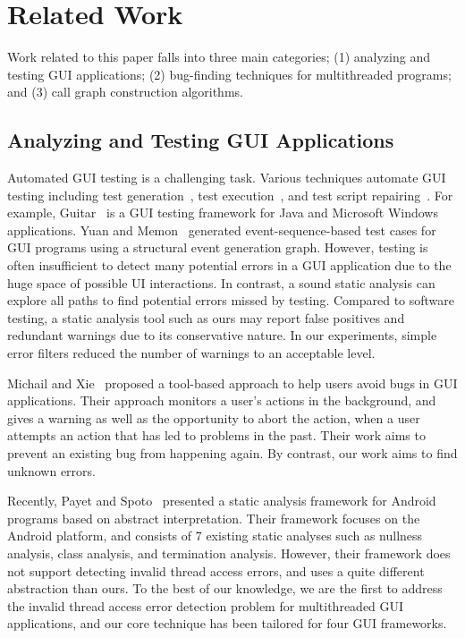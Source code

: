 
\tinystep
\section{Related Work}

Work related to this paper falls into three main categories; (1)
analyzing and testing GUI applications; (2)
bug-finding techniques for multithreaded programs; and (3)
call graph construction algorithms.

\tinystep
\subsection{Analyzing and Testing GUI Applications}

Automated GUI testing is a challenging task.
Various techniques automate GUI testing including
test generation~\cite{YuanMemonICSE2007},
test execution~\cite{YuanCohenMemonTSE2011},
and test script repairing~\cite{Huang:2010:RGT:1828417.1828465, Daniel:2011:AGR:2002931.2002937}.
For example,
Guitar~\cite{YuanCohenMemonTSE2011, YuanMemonICSE2007}
is a GUI testing framework for Java and Microsoft Windows applications. 
Yuan and Memon~\cite{YuanMemonICSE2007} generated event-sequence-based test cases for GUI
programs using a structural event generation graph. 
However, testing is often insufficient to detect many potential
errors in a GUI application due to the huge space of possible UI interactions.
In contrast, a sound static analysis can explore all paths to find potential errors missed by testing.
Compared to software testing, a static analysis tool such as ours may
report false positives and redundant warnings due to its conservative nature.
In our experiments, simple error filters reduced the number of warnings to
an acceptable level.


Michail and Xie~\cite{michail05:helping} proposed a tool-based approach to help users avoid bugs
in GUI applications. Their approach monitors a user's actions in the background,
and gives a warning as well as the opportunity to abort the action, when
a user attempts an action that has led to problems in the past. 
Their work aims to prevent an existing bug from happening again.
By contrast, our work aims to find unknown errors.


Recently, Payet and Spoto~\cite{Payet:2011:SAA:2032266.2032299} presented a static
analysis framework for Android programs based on  abstract
interpretation. Their framework focuses on the Android platform, and
 consists of 7 existing static analyses such as
nullness analysis, class analysis, and termination analysis.  However,
their framework does not support detecting invalid thread access
errors, and uses a quite different abstraction than ours.
To the best of our knowledge, we are the first to address the invalid
thread access error detection problem for multithreaded GUI applications, and
our core technique has been tailored for four GUI frameworks.


